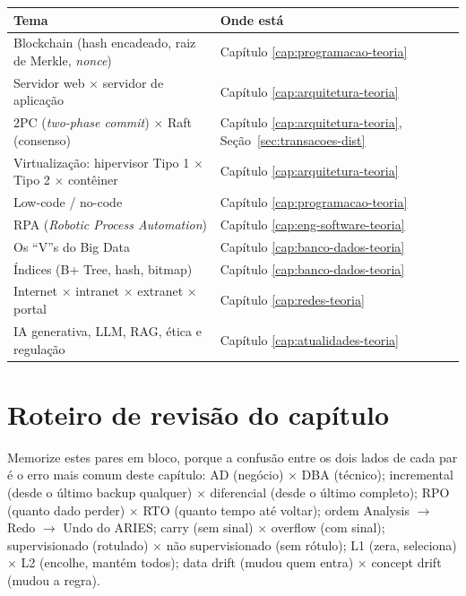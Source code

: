 \begin{center}
\begin{tabular}{@{}p{5cm}p{6cm}@{}}
\toprule
\textbf{Tema} & \textbf{Onde está} \\
\midrule
Blockchain (hash encadeado, raiz de Merkle, \textit{nonce}) & Capítulo
\ref{cap:programacao-teoria} \\
Servidor web $\times$ servidor de aplicação & Capítulo
\ref{cap:arquitetura-teoria} \\
2PC (\textit{two-phase commit}) $\times$ Raft (consenso) & Capítulo
\ref{cap:arquitetura-teoria}, Seção~\ref{sec:transacoes-dist} \\
Virtualização: hipervisor Tipo 1 $\times$ Tipo 2 $\times$ contêiner &
Capítulo \ref{cap:arquitetura-teoria} \\
Low-code / no-code & Capítulo \ref{cap:programacao-teoria} \\
RPA (\textit{Robotic Process Automation}) & Capítulo
\ref{cap:eng-software-teoria} \\
Os “V”s do Big Data & Capítulo \ref{cap:banco-dados-teoria} \\
Índices (B+ Tree, hash, bitmap) & Capítulo \ref{cap:banco-dados-teoria} \\
Internet $\times$ intranet $\times$ extranet $\times$ portal & Capítulo
\ref{cap:redes-teoria} \\
IA generativa, LLM, RAG, ética e regulação & Capítulo
\ref{cap:atualidades-teoria} \\
\bottomrule
\end{tabular}
\end{center}

\section{Roteiro de revisão do capítulo}

\begin{regrapratica}
Memorize estes pares em bloco, porque a confusão entre os dois lados de
cada par é o erro mais comum deste capítulo: AD (negócio) $\times$ DBA
(técnico); incremental (desde o último backup qualquer) $\times$
diferencial (desde o último completo); RPO (quanto dado perder) $\times$
RTO (quanto tempo até voltar); ordem Analysis $\to$ Redo $\to$ Undo do
ARIES; carry (sem sinal) $\times$ overflow (com sinal); supervisionado
(rotulado) $\times$ não supervisionado (sem rótulo); L1 (zera, seleciona)
$\times$ L2 (encolhe, mantém todos); data drift (mudou quem entra)
$\times$ concept drift (mudou a regra).
\end{regrapratica}
